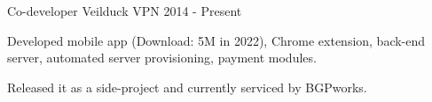 

\begin{cventries}

  \cventry
    {Co-developer} %
    {Veilduck VPN} %
    {} %
    {2014 - Present} %
    {
      \begin{cvitems} %
        \item {Developed mobile app (Download: 5M in 2022), Chrome extension, back-end server, automated server provisioning, payment modules.}
        \item {Released it as a side-project and currently serviced by BGPworks.}
      \end{cvitems}
    }

\end{cventries}
